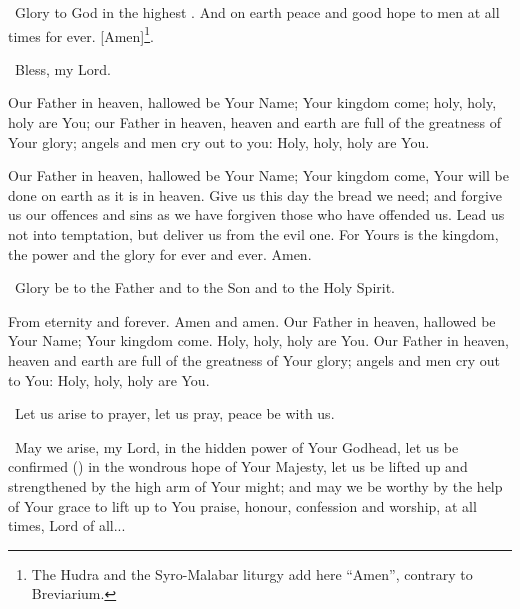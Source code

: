 \documentclass[12pt,twoside,a5paper]{article}
\begin{document}
\begin{halfparskip}

  \cc~Glory to God in the highest . And on earth peace and good hope to men at all times for ever. [Amen]\footnote{The Hudra and the Syro-Malabar liturgy add here ``Amen'', contrary to Breviarium.}.

  \rr~Bless, my Lord. 

  Our Father in heaven, hallowed be Your Name; Your kingdom come; holy, holy, holy are You; our Father in heaven, heaven and earth are full of the greatness of Your glory; angels and men cry out to you: Holy, holy, holy are You.

  Our Father in heaven, hallowed be Your Name; Your kingdom come, Your will be done on earth as it is in heaven. Give us this day the bread we need; and forgive us our offences and sins as we have forgiven those who have offended us. Lead us not into temptation, but deliver us from the evil one. For Yours is the kingdom, the power and the glory for ever and ever. Amen.

  \cc~Glory be to the Father and to the Son and to the Holy Spirit.

  From eternity and forever. Amen and amen. Our Father in heaven, hallowed be Your Name; Your kingdom come. Holy, holy, holy are You. Our Father in heaven, heaven and earth are full of the greatness of Your glory; angels and men cry out to You: Holy, holy, holy are You.
\end{halfparskip}

\dd~Let us arise to prayer, let us pray, peace be with us.

\cc~May we arise, my Lord, in the hidden power of Your Godhead, let us be confirmed () in the wondrous hope of Your Majesty, let us be lifted up and strengthened by the high arm of Your might; and may we be worthy by the help of Your grace to lift up to You praise, honour, confession and worship, at all times, Lord of all...



\end{document}
